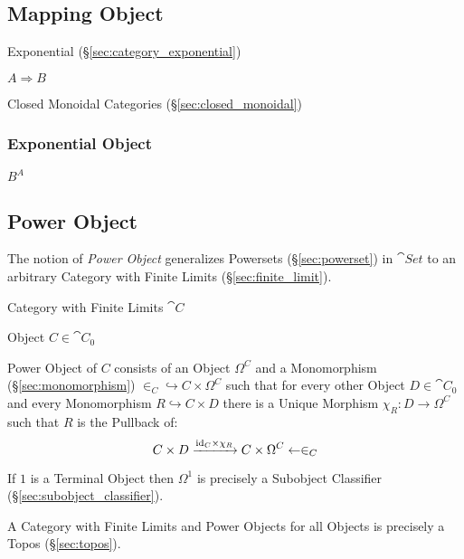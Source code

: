 \subsection{Mapping Object}\label{sec:mapping_object}

Exponential (\S\ref{sec:category_exponential})

$A \Rightarrow B$

Closed Monoidal Categories (\S\ref{sec:closed_monoidal})



\subsubsection{Exponential Object}\label{sec:exponential_object}

$B^A$



\subsection{Power Object}\label{sec:power_object}

The notion of \emph{Power Object} generalizes Powersets
(\S\ref{sec:powerset}) in $\cat{Set}$ to an arbitrary Category with
Finite Limits (\S\ref{sec:finite_limit}).

Category with Finite Limits $\cat{C}$

Object $C \in \cat{C}_0$

Power Object of $C$ consists of an Object $\Omega^C$ and a
Monomorphism (\S\ref{sec:monomorphism}) $\in_C \hookrightarrow C
\times \Omega^C$ such that for every other Object $D \in \cat{C}_0$
and every Monomorphism $R \hookrightarrow C \times D$ there is a
Unique Morphism $\chi_R : D \rightarrow \Omega^C$ such that $R$ is the
Pullback of:
\[
  C \times D \xrightarrow{\mathrm{id}_C \times \chi_R} C \times \Omega^C
    \leftarrow \in_C
\]

If $1$ is a Terminal Object then $\Omega^1$ is precisely a Subobject
Classifier (\S\ref{sec:subobject_classifier}).

A Category with Finite Limits and Power Objects for all Objects is
precisely a Topos (\S\ref{sec:topos}).



